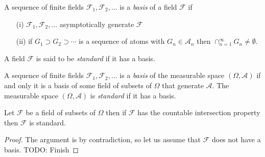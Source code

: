 \begin{defn}A sequence of finite fields $\mathcal{F}_1, \mathcal{F}_2, \dotsc$ is a \emph{basis} of a field $\mathcal{F}$ if 
\begin{itemize}
\item[(i)] $\mathcal{F}_1, \mathcal{F}_2, \dotsc$  asymptotically generate $\mathcal{F}$
\item[(ii)] if $G_1 \supset G_2 \supset \dotsb$ is a sequence of atoms with $G_n \in \mathcal{A}_n$ then $\cap_{n=1}^\infty G_n \neq \emptyset$.
\end{itemize}
A field $\mathcal{F}$ is said to be \emph{standard} if it has a basis.
\end{defn}

\begin{defn}A sequence of finite fields $\mathcal{F}_1, \mathcal{F}_2, \dotsc$ is a \emph{basis} of the measurable space $(\Omega, \mathcal{A})$ if and only it is a basis of some field of subsets of $\Omega$ that generate $\mathcal{A}$.  The measurable space $(\Omega, \mathcal{A})$ is \emph{standard} if it has a basis.
\end{defn}

\begin{prop}Let $\mathcal{F}$ be a field of subsets of $\Omega$ then if $\mathcal{F}$ has the countable intersection property then $\mathcal{F}$ is standard.
\end{prop}
\begin{proof}
The argument is by contradiction, so let us assume that $\mathcal{F}$ does not have a basis.
TODO: Finish
\end{proof}